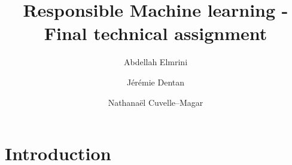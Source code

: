 \documentclass{article}
\title{Responsible Machine learning - Final technical assignment}
\author{Abdellah Elmrini \and Jérémie Dentan \and Nathanaël Cuvelle--Magar}
\begin{document}
\maketitle

\section*{Introduction}

\end{document}
